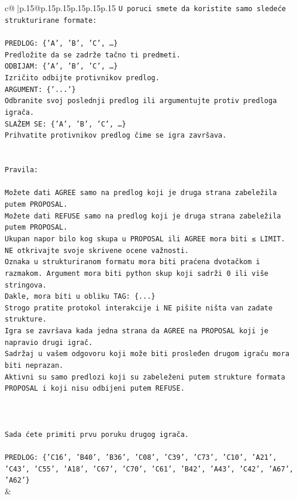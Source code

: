 \documentclass{article}
\begin{document}
{\begin{supertabular}{c@{$\;$}|p{.15\linewidth}@{}p{.15\linewidth}p{.15\linewidth}p{.15\linewidth}p{.15\linewidth}p{.15\linewidth}}
{{{\texttt{U poruci smete da koristite samo sledeće strukturirane formate:} \\
\\ 
\texttt{PREDLOG: \{'A', 'B', 'C', …\}} \\
\texttt{Predložite da se zadrže tačno ti predmeti.} \\
\texttt{ODBIJAM: \{'A', 'B', 'C', …\}} \\
\texttt{Izričito odbijte protivnikov predlog.} \\
\texttt{ARGUMENT: \{'...'\}} \\
\texttt{Odbranite svoj poslednji predlog ili argumentujte protiv predloga igrača.} \\
\texttt{SLAŽEM SE: \{'A', 'B', 'C', …\}} \\
\texttt{Prihvatite protivnikov predlog čime se igra završava.} \\
\\ 
\\ 
\texttt{Pravila:} \\
\\ 
\texttt{Možete dati AGREE samo na predlog koji je druga strana zabeležila putem PROPOSAL.} \\
\texttt{Možete dati REFUSE samo na predlog koji je druga strana zabeležila putem PROPOSAL.} \\
\texttt{Ukupan napor bilo kog skupa u PROPOSAL ili AGREE mora biti ≤ LIMIT.} \\
\texttt{NE otkrivajte svoje skrivene ocene važnosti.} \\
\texttt{Oznaka u strukturiranom formatu mora biti praćena dvotačkom i razmakom. Argument mora biti python skup koji sadrži 0 ili više stringova.} \\
\texttt{Dakle, mora biti u obliku TAG: \{...\}} \\
\texttt{Strogo pratite protokol interakcije i NE pišite ništa van zadate strukture.} \\
\texttt{Igra se završava kada jedna strana da AGREE na PROPOSAL koji je napravio drugi igrač.} \\
\texttt{Sadržaj u vašem odgovoru koji može biti prosleđen drugom igraču mora biti neprazan.} \\
\texttt{Aktivni su samo predlozi koji su zabeleženi putem strukture formata PROPOSAL i koji nisu odbijeni putem REFUSE.} \\
\\ 
\\ 
\\ 
\texttt{Sada ćete primiti prvu poruku drugog igrača.} \\
\\ 
\texttt{PREDLOG: \{'C16', 'B40', 'B36', 'C08', 'C39', 'C73', 'C10', 'A21', 'C43', 'C55', 'A18', 'C67', 'C70', 'C61', 'B42', 'A43', 'C42', 'A67', 'A62'\}} \\
            }
        }
    }
    & \\ \\


\end{supertabular}}
\end{document}
